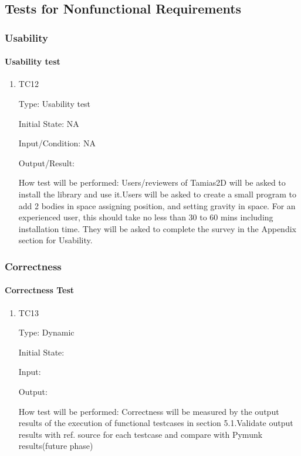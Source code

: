 \documentclass[12pt, titlepage]{article}
\newcommand{\progname}{Tamias2D}
\begin{document}
\subsection{Tests for Nonfunctional Requirements}

\subsubsection{Usability}
		
\paragraph{Usability test}

\begin{enumerate}

\item{TC12\\}

Type: Usability test
					
Initial State: NA
					
Input/Condition: NA
					
Output/Result: 
					
How test will be performed: Users/reviewers of \progname{} will be asked to install the library and use it.Users will be asked to create a small program to add 2 bodies in space assigning position, and setting gravity in space.  For an experienced user, this should take no less than 30 to 60 mins including installation time. They will be asked to complete the survey in the Appendix section for Usability. 
					
\end{enumerate}


\subsubsection{Correctness}

\paragraph{Correctness Test}

\begin{enumerate}

\item{TC13\\}

Type: Dynamic

Initial State: 

Input: 

Output: 

How test will be performed: Correctness will be measured by the output results of the execution of functional testcases in section 5.1.Validate output results with ref. source for each testcase and compare with Pymunk results(future phase)
\end{enumerate}
\end{document}
